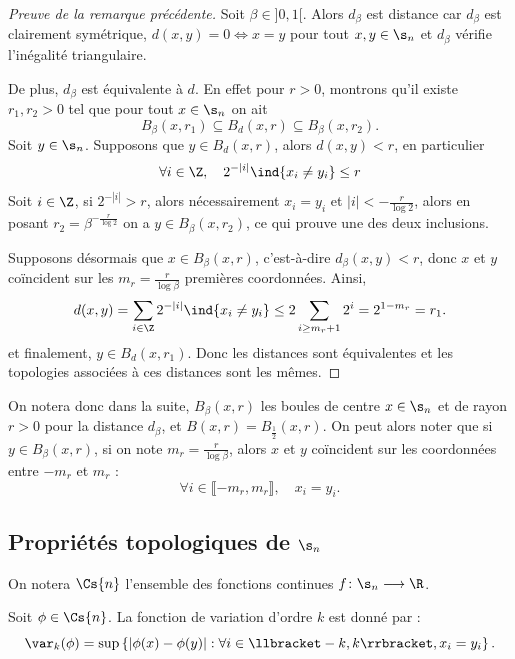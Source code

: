   \begin{proof}[Preuve de la remarque précédente]
    Soit $\beta \in ]0, 1[$. Alors $d_{\beta}$ est distance car $d_{\beta}$ est clairement symétrique, $d(x, y) = 0 \iff x = y$ pour tout $x,y\in\s_n$
    et $d_{\beta}$ vérifie l'inégalité triangulaire.

    De plus, $d_{\beta}$ est équivalente à $d$. En effet pour $r > 0$, montrons qu'il existe $r_1, r_2 > 0$ tel que pour tout $x \in \s_n$ on ait
    $$B_{\beta}(x, r_1) \subseteq  B_d(x, r) \subseteq B_{\beta}(x, r_2).$$
    Soit $y \in \s_n$. Supposons que $y \in B_d(x, r)$, alors $d(x, y) < r$, en particulier
    $$\forall i \in \Z, \hspace{1em}2^{-|i|}\ind{x_i \not= y_i} \leq r$$
    Soit $i \in \Z$, si $2^{-|i|} > r$, alors nécessairement $x_i = y_i$ et $|i| < -\frac{r}{\log{2}}$,
    alors en posant $r_2 = \beta^{-\frac{r}{\log{2}}}$ on a $y \in B_{\beta}(x, r_2)$, ce qui prouve une des deux inclusions.

    Supposons désormais que $x \in B_{\beta}(x, r)$, c'est-à-dire $d_{\beta}(x, y) < r$,
    donc $x$ et $y$ coïncident sur les $m_r = \frac{r}{\log{\beta}}$ premières coordonnées.
    Ainsi,
    $$d(x, y) = \sum_{i\in\Z}{2^{-|i|}\ind{x_i \not= y_i}} \leq 2\sum_{i \geq m_r + 1}{2^i} = 2^{1 - m_r} = r_1.$$
    et finalement, $y \in B_d(x, r_1)$. Donc les distances sont équivalentes et les topologies associées à ces distances sont les mêmes.
  \end{proof}

  On notera donc dans la suite, $B_{\beta}(x, r)$ les boules de centre $x \in \s_n$ et de rayon $r > 0$ pour la distance $d_{\beta}$,
  et $B(x, r) = B_{\frac 1 2}(x, r)$.
  On peut alors noter que si $y \in B_{\beta}(x, r)$, si on note $m_r = \frac{r}{\log{\beta}}$, alors $x$ et $y$ coïncident sur les coordonnées entre
  $-m_r$ et $m_r$ :
  $$\forall i \in \llbracket -m_r, m_r \rrbracket, \hspace{1em} x_i = y_i.$$

  \subsection{Propriétés topologiques de $\s_n$}

  On notera $\Cs{n}$ l'ensemble des fonctions continues $f \colon \s_n \longrightarrow \R$.

  \begin{definition}
    \label{def:var_potentiel}
    \leanok
    Soit $\phi \in \Cs{n}$. La fonction de variation d'ordre $k$ est donné par :
    $$\var_k(\phi) = \sup\left\{|\phi(x) - \phi(y)| : \forall i \in \llbracket -k, k\rrbracket, x_i = y_i \right\}.$$
  \end{definition}


